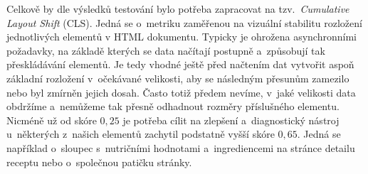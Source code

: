 Celkově by dle výsledků testování bylo potřeba zapracovat na tzv.~\emph{Cumulative Layout Shift} (CLS). Jedná se o~metriku zaměřenou na vizuální stabilitu rozložení jednotlivých elementů v HTML dokumentu. Typicky je ohrožena asynchronními požadavky, na základě kterých se data načítají postupně a~způsobují tak přeskládávání elementů. Je tedy vhodné ještě před načtením dat vytvořit aspoň základní rozložení v~očekávané velikosti, aby se následným přesunům zamezilo nebo byl zmírněn jejich dosah. Často totiž předem nevíme, v~jaké velikosti data obdržíme a~nemůžeme tak přesně odhadnout rozměry příslušného elementu. Nicméně už od skóre $0,25$ je potřeba cílit na zlepšení \citep{cls-metric} a~diagnostický nástroj u~některých z~našich elementů zachytil podstatně vyšší skóre $0,65$. Jedná se například o~sloupec s~nutričními hodnotami a~ingrediencemi na stránce detailu receptu nebo o~společnou patičku stránky.
